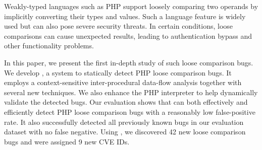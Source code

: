 Weakly-typed languages such as PHP support loosely comparing two operands by implicitly converting their types and values.
Such a language feature is widely used but can also pose severe security threats. 
In certain conditions, loose comparisons can cause unexpected results, leading to authentication bypass and other functionality problems.

In this paper, we present the first in-depth study of such loose comparison bugs.
We develop \sys, a system to statically detect PHP loose comparison bugs.
It employs a context-sensitive inter-procedural data-flow analysis together with several new techniques.
We also enhance the PHP interpreter to help dynamically validate the detected bugs.
Our evaluation shows that \sys can both effectively and efficiently detect PHP loose comparison bugs with a reasonably low false-positive rate.
It also successfully detected all previously known bugs in our evaluation dataset with no false negative.
Using \sys, we discovered 42 new loose comparison bugs and were assigned 9 new CVE IDs.
